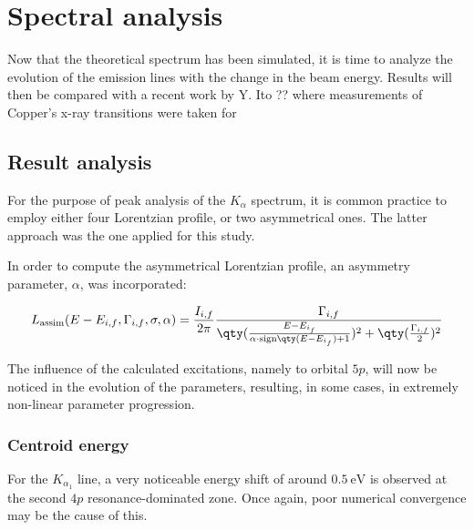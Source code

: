 
%

\chapter{Spectral analysis}

Now that the theoretical spectrum has been simulated, it is time to analyze the evolution of the emission lines with the change in the beam energy. Results will then be compared with a recent work by Y. Ito ?? where measurements of Copper's x-ray transitions were taken for



\section{Result analysis}

For the purpose of peak analysis of the $K_{\alpha}$ spectrum, it is common practice to employ either four Lorentzian profile, or two asymmetrical ones. The latter approach was the one applied for this study.


In order to compute the asymmetrical Lorentzian profile, an asymmetry parameter, $\alpha$, was incorporated:

\begin{equation}
    L_{\text{assim}}(E-E_{i,f},\Gamma_{i,f},\sigma,\alpha)=\frac{I_{i,f}}{2\pi}\frac{\Gamma_{i,f}}{\qty(\frac{E-E_{i_f}}{\alpha\cdot \text{sign}\qty(E-E_{i_f})+1})^2+\qty(\frac{\Gamma_{i,f}}{2})^2}
\end{equation}

The influence of the calculated excitations, namely to orbital $5p$, will now be noticed in the evolution of the parameters, resulting, in some cases, in extremely non-linear parameter progression.
\subsection{Centroid energy}

For the $K_{\alpha_1}$ line, a very noticeable energy shift of around $0.5\ \si{\electronvolt}$ is observed at the second $4p$ resonance-dominated zone. Once again, poor numerical convergence may be the cause of this.

